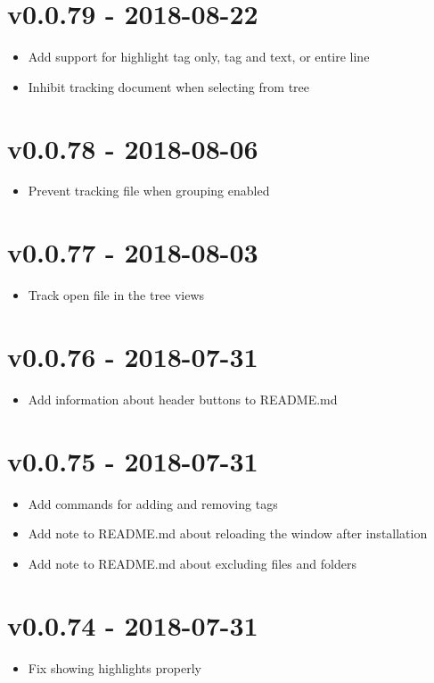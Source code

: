 \chapter{v0.0.79 - 2018-08-22}
\begin{itemize}
\item{Add support for highlight tag only, tag and text, or entire line}
\item{Inhibit tracking document when selecting from tree}
\end{itemize}

\chapter{v0.0.78 - 2018-08-06}
\begin{itemize}
\item{Prevent tracking file when grouping enabled}
\end{itemize}

\chapter{v0.0.77 - 2018-08-03}
\begin{itemize}
\item{Track open file in the tree views}
\end{itemize}

\chapter{v0.0.76 - 2018-07-31}
\begin{itemize}
\item{Add information about header buttons to README.md}
\end{itemize}

\chapter{v0.0.75 - 2018-07-31}
\begin{itemize}
\item{Add commands for adding and removing tags}
\item{Add note to README.md about reloading the window after installation}
\item{Add note to README.md about excluding files and folders}
\end{itemize}

\chapter{v0.0.74 - 2018-07-31}
\begin{itemize}
\item{Fix showing highlights properly}
\end{itemize}

